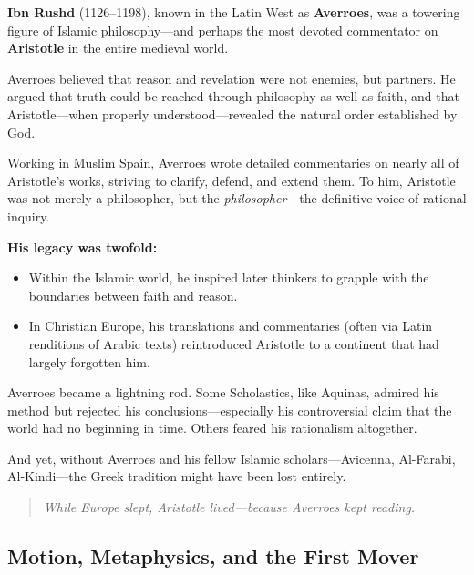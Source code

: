 \begin{tcolorbox}[colback=gray!5!white, colframe=black!75!white, title={Historical Sidebar: Averroes and the Bridge of Aristotle}]

    \textbf{Ibn Rushd} (1126–1198), known in the Latin West as \textbf{Averroes}, was a towering figure of Islamic philosophy—and perhaps the most devoted commentator on \textbf{Aristotle} in the entire medieval world.
    
    Averroes believed that reason and revelation were not enemies, but partners. He argued that truth could be reached through philosophy as well as faith, and that Aristotle—when properly understood—revealed the natural order established by God.
    
    Working in Muslim Spain, Averroes wrote detailed commentaries on nearly all of Aristotle’s works, striving to clarify, defend, and extend them. To him, Aristotle was not merely a philosopher, but the \textit{philosopher}—the definitive voice of rational inquiry.
    
    \medskip
    
    \textbf{His legacy was twofold:}
    \begin{itemize}
        \item Within the Islamic world, he inspired later thinkers to grapple with the boundaries between faith and reason.
        \item In Christian Europe, his translations and commentaries (often via Latin renditions of Arabic texts) reintroduced Aristotle to a continent that had largely forgotten him.
    \end{itemize}
    
    Averroes became a lightning rod. Some Scholastics, like Aquinas, admired his method but rejected his conclusions—especially his controversial claim that the world had no beginning in time. Others feared his rationalism altogether.
    
    And yet, without Averroes and his fellow Islamic scholars—Avicenna, Al-Farabi, Al-Kindi—the Greek tradition might have been lost entirely.
    
    \begin{quote}
    \textit{While Europe slept, Aristotle lived—because Averroes kept reading.}
    \end{quote}
    
\end{tcolorbox}


\subsection{Motion, Metaphysics, and the First Mover}

